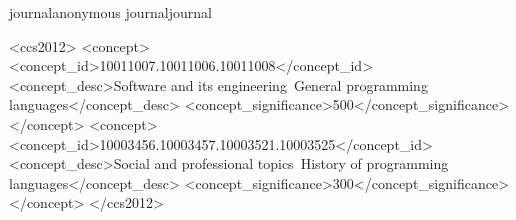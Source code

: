 \documentclass[review, anonymous, acmsmall]{acmart}
\def\acmversionanonymous{anonymous}
\def\acmversionjournal{journal}
\def\acmversion{anonymous}
\def\acmversion{journal}
\begin{document}
\begin{abstract}


  Curabitur dictum gravida mauris.
  Nam arcu libero, nonummy eget, consectetuer id, vulputate a, magna.
  Donec vehicula augue eu neque.
  Pellentesque habitant morbi tristique senectus et netus et malesuada fames ac turpis egestas.
  Cras viverra metus rhoncus sem.

  Our \emph{key} insight defines the mass-energy equivalence relationship as: $E = mc^2$.
  We prototype our approach in \toolname{}.

  Curabitur dictum gravida mauris.
  Nam arcu libero, nonummy eget, consectetuer id, vulputate a, magna.
  Donec vehicula augue eu neque.
  Pellentesque habitant morbi tristique senectus et netus et malesuada fames ac turpis egestas.
  Cras viverra metus rhoncus sem.
\end{abstract}

\ifx\acmversion\acmversionanonymous
{} %
\renewcommand\footnotetextcopyrightpermission[1]{} %
\fi
\ifx\acmversion\acmversionjournal
\begin{CCSXML}
<ccs2012>
<concept>
<concept_id>10011007.10011006.10011008</concept_id>
<concept_desc>Software and its engineering~General programming languages</concept_desc>
<concept_significance>500</concept_significance>
</concept>
<concept>
<concept_id>10003456.10003457.10003521.10003525</concept_id>
<concept_desc>Social and professional topics~History of programming languages</concept_desc>
<concept_significance>300</concept_significance>
</concept>
</ccs2012>
\end{CCSXML}
\end{document}
